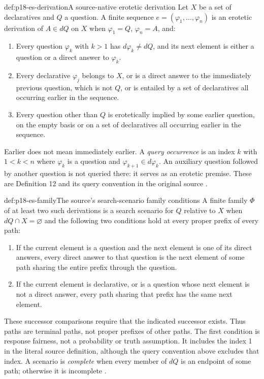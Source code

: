 \begin{hbdefinition}{def:p18-es-derivation}{A source-native erotetic derivation}
Let \(X\) be a set of declaratives and \(Q\) a question. A finite sequence
\(e=(\varphi_1,\ldots,\varphi_n)\) is an erotetic derivation of
\(A\in dQ\) on \(X\) when \(\varphi_1=Q\), \(\varphi_n=A\), and:
\begin{enumerate}
\item Every question \(\varphi_k\) with \(k>1\) has
\(d\varphi_k\ne dQ\), and its next element is either a question or
a direct answer to \(\varphi_k\).
\item Every declarative \(\varphi_j\) belongs to \(X\), or is a direct
answer to the immediately previous question, which is not \(Q\), or is
entailed by a set of declaratives all occurring earlier in the sequence.
\item Every question other than \(Q\) is erotetically implied by some
earlier question, on the empty basis or on a set of declaratives all occurring
earlier in the sequence.
\end{enumerate}
Earlier does not mean immediately earlier. A \emph{query occurrence} is
an index \(k\) with \(1<k<n\) where \(\varphi_k\) is a question and
\(\varphi_{k+1}\in d\varphi_k\). An auxiliary question followed by
another question is not queried there: it serves as an erotetic premise.
These are Definition 12 and its query convention in the original source
\cite[pp.~34--35]{Wisniewski2001QuestionsInferences}.
\end{hbdefinition}

\begin{hbdefinition}{def:p18-es-family}{The source's search-scenario family conditions}
A finite family \(\Phi\) of at least two such derivations is a search
scenario for \(Q\) relative to \(X\) when \(dQ\cap X=\varnothing\)
and the following two conditions hold at every proper prefix of every path:
\begin{enumerate}
\item If the current element is a question and the next element is one of
its direct answers, every direct answer to that question is the next element
of some path sharing the entire prefix through the question.
\item If the current element is declarative, or is a question whose next
element is not a direct answer, every path sharing that prefix has the same
next element.
\end{enumerate}
These successor comparisons require that the indicated successor exists.
Thus paths are terminal paths, not proper prefixes of other paths. The
first condition is response fairness, not a probability or truth assumption.
It includes the index 1 in the literal source definition, although the query
convention above excludes that index. A scenario is \emph{complete} when
every member of \(dQ\) is an endpoint of some path; otherwise it is incomplete
\cite[p.~35]{Wisniewski2001QuestionsInferences}.
\end{hbdefinition}

